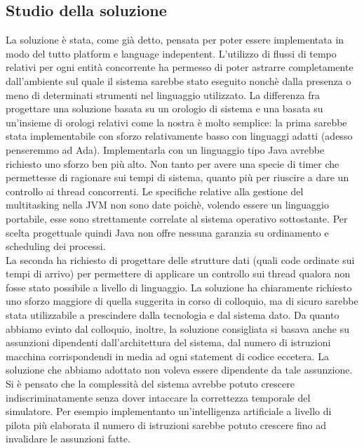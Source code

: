 \subsection{Studio della soluzione}
La soluzione è stata, come già detto, pensata per poter essere implementata in modo del tutto platform e language indepentent. L’utilizzo di flussi di tempo relativi per ogni entità concorrente ha permesso di poter astrarre completamente dall’ambiente sul quale il sistema sarebbe stato eseguito nonchè dalla presenza o meno di determinati strumenti nel linguaggio utilizzato.
La differenza fra progettare una soluzione basata su un orologio di sistema e una basata su un'insieme di orologi relativi come la nostra è molto semplice: la prima sarebbe stata implementabile con sforzo relativamente basso con linguaggi adatti (adesso penseremmo ad Ada). Implementarla con un linguaggio tipo Java avrebbe richiesto uno sforzo ben più alto. Non tanto per avere una specie di timer che permettesse di ragionare sui tempi di sistema, quanto più per riuscire a dare un controllo ai thread concorrenti. Le specifiche relative alla gestione del multitasking nella JVM non sono date poichè, volendo essere un linguaggio portabile, esse sono strettamente correlate al sistema operativo sottostante. Per scelta progettuale quindi Java non offre nessuna garanzia su ordinamento e scheduling dei processi.\\
La seconda ha richiesto di progettare delle strutture dati (quali code ordinate sui tempi di arrivo) per permettere di applicare un controllo sui thread qualora non fosse stato possibile a livello di linguaggio. La soluzione ha chiaramente richiesto uno sforzo maggiore di quella suggerita in corso di colloquio, ma di sicuro sarebbe stata utilizzabile a prescindere dalla tecnologia e dal sistema dato.
Da quanto abbiamo evinto dal colloquio, inoltre, la soluzione consigliata si basava anche su assunzioni dipendenti dall’architettura del sistema, dal numero di istruzioni macchina corrispondendi in media ad ogni statement di codice eccetera. La soluzione che abbiamo adottato non voleva essere dipendente da tale assunzione. Si è pensato che la complessità del sistema avrebbe potuto crescere indiscriminatamente senza dover intaccare la correttezza temporale del simulatore. Per esempio implementanto un’intelligenza artificiale a livello di pilota più elaborata il numero di istruzioni sarebbe  potuto crescere fino ad invalidare le assunzioni fatte.
